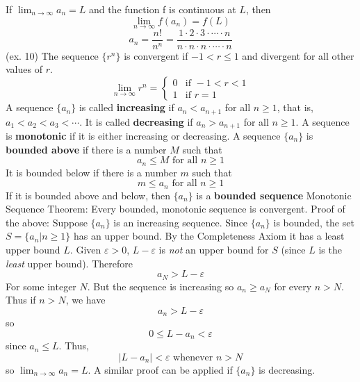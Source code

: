 \documentclass{article}
\begin{document}
        \begin{outline}
        \1 If \(\lim_{n\to\infty}a_n=L\) and the function f is continuous at $L$, then \[\lim_{n\to\infty}f(a_n)=f(L)\]
        \1 \[a_n=\dfrac{n!}{n^n}=\dfrac{1\cdot2\cdot3\cdot\cdots\cdot n}{n\cdot n\cdot n\cdot\cdots\cdot n}\] (ex. 10)
        \1 The sequence \(\{r^n\}\) is convergent if \(-1<r\leq 1\) and divergent for all other values of $r$. \[\lim_{n\to\infty}r^n=\begin{cases} 0 & \mbox{if } -1<r<1 \\ 1 & \mbox{if }r=1 \end{cases}\]
        \1 A sequence \(\{a_n\}\) is called \textbf{increasing} if \(a_n<a_{n+1}\) for all \(n\geq 1\), that is, \(a_1<a_2<a_3<\cdots\). It is called \textbf{decreasing} if \(a_n>a_{n+1}\) for all \(n\geq 1\). A sequence is \textbf{monotonic} if it is either increasing or decreasing. 
        \1 A sequence \(\{a_n\}\) is \textbf{bounded above} if there is a number $M$ such that \[a_n\leq M\mbox{    for all }n\geq 1\] It is bounded below if there is a number $m$ such that \[m\leq a_n\text{    for all }n\geq 1\] If it is bounded above and below, then \(\{a_n\}\) is a \textbf{bounded sequence}
        \1 Monotonic Sequence Theorem: Every bounded, monotonic sequence is convergent. 
        \1 Proof of the above: Suppose \(\{a_n\}\) is an increasing sequence. Since \(\{a_n\}\) is bounded, the set \(S=\{a_n|n\geq 1\}\) has an upper bound. By the Completeness Axiom it has a least upper bound $L$. Given \(\varepsilon>0\), \(L-\varepsilon\) is \textit{not} an upper bound for $S$ (since $L$ is the \textit{least} upper bound). Therefore \[a_N>L-\varepsilon\] For some integer $N$. But the sequence is increasing so \(a_n\geq a_N\) for every \(n>N\). Thus if \(n>N\), we have \[a_n>L-\varepsilon\] so \[0\leq L-a_n<\varepsilon\] since \(a_n\leq L\). Thus, \[|L-a_n|<\varepsilon\text{     whenever }n>N \] so \(\lim_{n\to\infty}a_n=L\). A similar proof can be applied if \(\{a_n\}\) is decreasing. 
    \end{outline}
\end{document}
